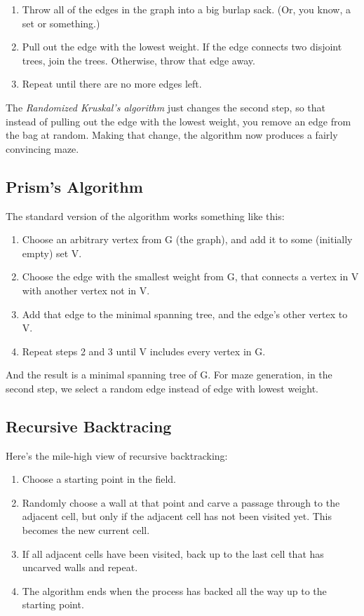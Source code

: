 \documentclass{article}
\begin{document}
{\begin{enumerate}
    \item Throw all of the edges in the graph into a big burlap sack. (Or, you know, a set or something.)
    \item Pull out the edge with the lowest weight. If the edge connects two disjoint trees, join the trees. Otherwise, throw that edge away.
    \item Repeat until there are no more edges left.
\end{enumerate}

The {\it Randomized Kruskal's algorithm} just changes the second step, so that instead of pulling out the edge with the lowest weight, you remove an edge from the bag at random. Making that change, the algorithm now produces a fairly convincing maze.

\subsection{Prism's Algorithm}
The standard version of the algorithm works something like this:
\begin{enumerate}
    \item Choose an arbitrary vertex from G (the graph), and add it to some (initially empty) set V.
    \item Choose the edge with the smallest weight from G, that connects a vertex in V with another vertex not in V.
    \item Add that edge to the minimal spanning tree, and the edge's other vertex to V.
    \item Repeat steps 2 and 3 until V includes every vertex in G.
\end{enumerate}

And the result is a minimal spanning tree of G. For maze generation, in the second step, we select a random edge instead of edge with lowest weight.

\subsection{Recursive Backtracing}
Here's the mile-high view of recursive backtracking:
\begin{enumerate}
    \item Choose a starting point in the field.
    \item Randomly choose a wall at that point and carve a passage through to the adjacent cell, but only if the adjacent cell has not been visited yet. This becomes the new current cell.
    \item If all adjacent cells have been visited, back up to the last cell that has uncarved walls and repeat.
    \item The algorithm ends when the process has backed all the way up to the starting point.
\end{enumerate}

}
\end{document}

